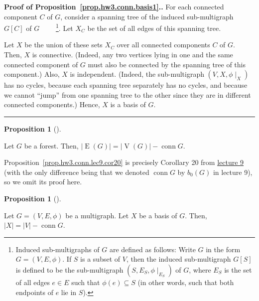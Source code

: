 \documentclass[numbers=enddot,12pt,final,onecolumn,notitlepage]{scrartcl}%
\theoremstyle{definition}
\newtheorem{prop}[theo]{Proposition}
\newenvironment{proposition}[1][]
{\begin{prop}[#1]\begin{leftbar}}
{\end{leftbar}\end{prop}}
\newenvironment{proof}[1][Proof]{\noindent\textbf{#1.} }{\ \rule{0.5em}{0.5em}}
\newcommand{\conn}{\operatorname{conn}}
\newcommand{\abs}[1]{\left| #1 \right|}
\newcommand{\tup}[1]{\left( #1 \right)}
\newcommand{\ive}[1]{\left[ #1 \right]}
\newcommand{\verts}[1]{\operatorname{V}\left( #1 \right)}
\newcommand{\edges}[1]{\operatorname{E}\left( #1 \right)}
\begin{document}
\begin{proof}[Proof of Proposition~\ref{prop.hw3.conn.basis1}.]
For each connected component $C$ of $G$, consider a spanning
tree of the induced sub-multigraph $G\ive{C}$ of $G$
\ \ \ \ \footnote{Induced sub-multigraphs of $G$ are defined as
follows:
Write $G$ in the form $G = \tup{V, E, \phi}$.
If $S$ is a subset of $V$, then the induced sub-multigraph
$G\ive{S}$ is defined to be the sub-multigraph
$\tup{S, E_S, \phi\mid_{E_S}}$ of $G$, where $E_S$ is the set
of all edges $e \in E$ such that $\phi\tup{e} \subseteq S$
(in other words, such that both endpoints of $e$ lie in $S$).}.
Let $X_C$ be the set of all edges of this spanning tree.

Let $X$ be the union of these sets $X_C$ over all connected
components $C$ of $G$.
Then, $X$ is connective.
(Indeed, any two
vertices lying in one and the same connected component of $G$
must also be connected by the spanning tree of this component.)
Also, $X$ is independent.
(Indeed, the sub-multigraph $\tup{V, X, \phi\mid_X}$ has
no cycles, because each spanning tree separately has no cycles, and
because we cannot ``jump'' from one spanning tree to the other
since they are in different connected components.)
Hence, $X$ is a basis of $G$.
\end{proof}

\begin{proposition} \label{prop.hw3.conn.lec9.cor20}
Let $G$ be a forest.
Then, $\abs{\edges{G}} = \abs{\verts{G}} - \conn G$.
\end{proposition}

Proposition~\ref{prop.hw3.conn.lec9.cor20} is precisely
Corollary 20 from
\href{http://www.cip.ifi.lmu.de/~grinberg/t/17s/5707lec9.pdf}{lecture 9}
(with the only difference being that we denoted $\conn G$
by $b_0 \tup{G}$ in lecture 9),
so we omit its proof here.

\begin{proposition} \label{prop.hw3.conn.basis2}
Let $G = \tup{V, E, \phi}$ be a multigraph.
Let $X$ be a basis of $G$.
Then, $\abs{X} = \abs{V} - \conn G$.
\end{proposition}
\end{document}
